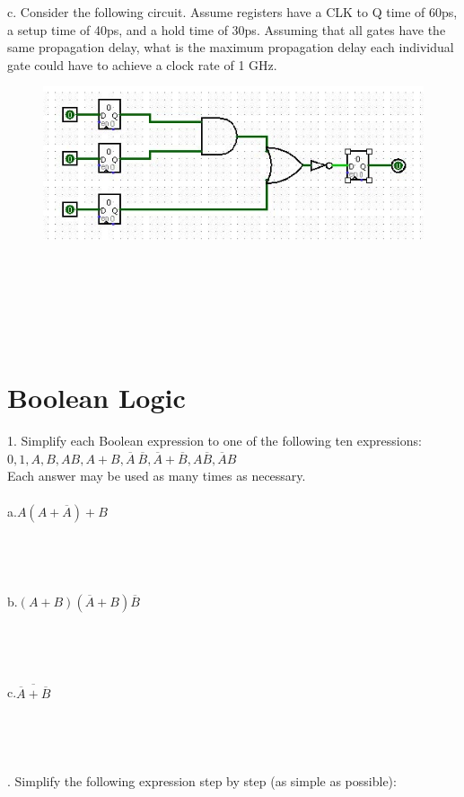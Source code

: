 \documentclass{article}
\begin{document}
\noindent c. Consider the following circuit. Assume registers have a CLK to Q time of 60ps, a setup time of 40ps, and a hold time of 30ps. Assuming that all gates have the same propagation delay, what is the maximum propagation delay each individual gate could have to achieve a clock rate of 1 GHz.
\begin{figure}[htbp]
	\centering
	\includegraphics[width=0.7\linewidth]{hw4_3.jpg}
	\label{fig:1}
\end{figure}
~\\
~\\
~\\
~\\
~\\
\newpage
\section{Boolean Logic}
1. Simplify each Boolean expression to one of the following ten expressions:  \\
$0, 1, A, B, AB, A+B, \overline{A} \ \overline{B}, \overline{A}+\overline{B}, A\overline{B}, \overline{A}B$\\
Each answer may be used as many times as necessary.\\
~\\
a.$A(A+\overline{A})+B$
~\\
~\\
~\\
~\\
~\\

\noindent b.$(A+B)(\overline{A}+B)\overline{B}$
~\\
~\\
~\\
~\\
~\\

\noindent c.$\overline{{\overline{A}+\overline{B}}}$
~\\
~\\
~\\
~\\
~\\
. Simplify the following expression step by step (as simple as possible):\\
\end{document}
